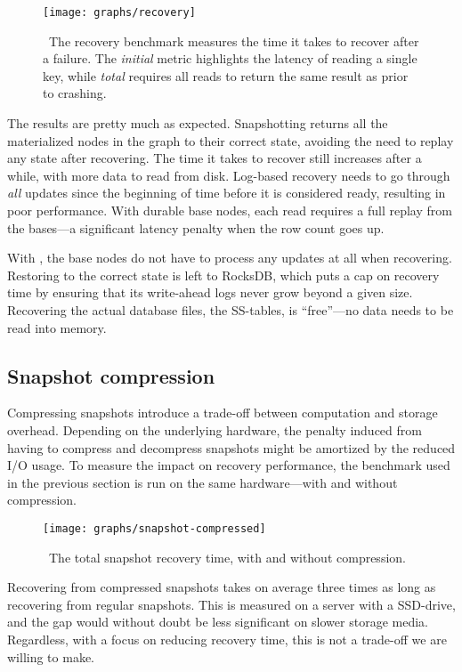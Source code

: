 \begin{figure}[H]
  \texttt{[image: graphs/recovery]}
  \caption{\
    The recovery benchmark measures the time it takes to recover after
    a failure. The \textit{initial} metric highlights the latency of reading a
    single key, while \textit{total} requires all reads to return the same
    result as prior to crashing.
  }\label{fig:graph-recovery}
\end{figure}

The results are pretty much as expected. Snapshotting returns all the
materialized nodes in the graph to their correct state, avoiding the need to
replay any state after recovering. The time it takes to recover still increases
after a while, with more data to read from disk. Log-based recovery needs to go
through \textit{all} updates since the beginning of time before it is considered
ready, resulting in poor performance. With durable base nodes, each read
requires a full replay from the bases---a significant latency penalty when the
row count goes up.

With , the base nodes do not have to process any updates
at all when recovering. Restoring \code{PersistentState} to the correct state is
left to RocksDB, which puts a cap on recovery time by ensuring that its
write-ahead logs never grow beyond a given size. Recovering the actual database
files, the SS-tables, is ``free''---no data needs to be read into memory.

\subsection{Snapshot compression}

Compressing snapshots introduce a trade-off between computation and storage
overhead. Depending on the underlying hardware, the penalty induced from having
to compress and decompress snapshots might be amortized by the reduced I/O
usage. To measure the impact on recovery performance, the benchmark used in the
previous section is run on the same hardware---with and without \code{zlib}
compression.

\begin{figure}[H]
  \texttt{[image: graphs/snapshot-compressed]}
  \caption{\
    The total snapshot recovery time, with and without compression.
  }\label{fig:snapshot-compressed}
\end{figure}

Recovering from compressed snapshots takes on average three times as long as
recovering from regular snapshots. This is measured on a server with a
SSD-drive, and the gap would without doubt be less significant on slower storage
media. Regardless, with a focus on reducing recovery time, this is not a
trade-off we are willing to make.

